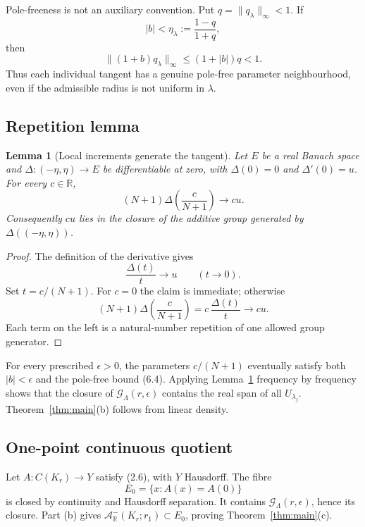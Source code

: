 \documentclass[11pt]{article}
\newtheorem{lemma}[theorem]{Lemma}
\newcommand{\R}{\mathbb R}
\newcommand{\cA}{\mathcal A}
\newcommand{\cG}{\mathcal G}
\begin{document}
Pole-freeness is not an auxiliary convention.  Put \(q=\|q_\lambda\|_\infty<1\).
If
\[
 |b|<\eta_\lambda:=\frac{1-q}{1+q},
 \tag{6.4}
\]
then
\[
 \|(1+b)q_\lambda\|_\infty
 \leq(1+|b|)q<1.
 \tag{6.5}
\]
Thus each individual tangent has a genuine pole-free parameter neighbourhood,
even if the admissible radius is not uniform in \(\lambda\).

\subsection{Repetition lemma}

\begin{lemma}[Local increments generate the tangent]\label{lem:repeat}
Let \(E\) be a real Banach space and \(\Delta:(-\eta,\eta)\to E\) be
differentiable at zero, with \(\Delta(0)=0\) and \(\Delta'(0)=u\).  For every
\(c\in\R\),
\[
 (N+1)\Delta\!\left(\frac{c}{N+1}\right)\longrightarrow cu.
 \tag{6.6}
\]
Consequently \(cu\) lies in the closure of the additive group generated by
\(\Delta((-\eta,\eta))\).
\end{lemma}

\begin{proof}
The definition of the derivative gives
\[
 \frac{\Delta(t)}{t}\longrightarrow u\qquad(t\to0).
 \]
Set \(t=c/(N+1)\).  For \(c=0\) the claim is immediate; otherwise
\[
 (N+1)\Delta\!\left(\frac{c}{N+1}\right)
 =c\,\frac{\Delta(t)}{t}\longrightarrow cu.
\]
Each term on the left is a natural-number repetition of one allowed group
generator.
\end{proof}

For every prescribed \(\epsilon>0\), the parameters \(c/(N+1)\) eventually satisfy
both \(|b|<\epsilon\) and the pole-free bound (6.4).  Applying
Lemma~\ref{lem:repeat} frequency by frequency shows that the closure of
\(\cG_\Lambda(r,\epsilon)\) contains the real span of all \(U_{\lambda_j}\).
Theorem~\ref{thm:main}(b) follows from linear density.

\subsection{One-point continuous quotient}

Let \(A:C(K_r)\to Y\) satisfy (2.6), with \(Y\) Hausdorff.  The fibre
\[
 E_0=\{x:A(x)=A(0)\}
\tag{6.7}
\]
is closed by continuity and Hausdorff separation.  It contains
\(\cG_\Lambda(r,\epsilon)\), hence its closure.  Part (b) gives
\(\cA^-_\R(K_r;r_1)\subset E_0\), proving Theorem~\ref{thm:main}(c).
\end{document}
